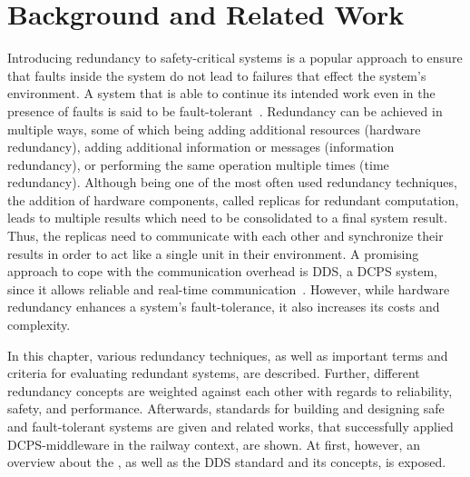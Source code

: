  \chapter{Background and Related Work}
\label{chptr:concepts}

Introducing redundancy to safety-critical systems is a popular approach to ensure that faults inside the system do not lead to failures that effect the system's environment.
A system that is able to continue its intended work even in the presence of faults is said to be fault-tolerant~\cite{BarryFaultToleranceAnalysis}.
Redundancy can be achieved in multiple ways, some of which being adding additional resources (hardware redundancy), adding additional information or messages (information redundancy), or performing the same operation multiple times (time redundancy).
Although being one of the most often used redundancy techniques, the addition of hardware components, called replicas for redundant computation, leads to multiple results which need to be consolidated to a final system result.
Thus, the replicas need to communicate with each other and synchronize their results in order to act like a single unit in their environment.
A promising approach to cope with the communication overhead is \gls*{DDS}, a \gls*{DCPS} system, since it allows reliable and real-time communication~\cite{omgDDSspec}.
However, while hardware redundancy enhances a system's fault-tolerance, it also increases its costs and complexity.

In this chapter, various redundancy techniques, as well as important terms and criteria for evaluating redundant systems, are described.
Further, different redundancy concepts are weighted against each other with regards to reliability, safety, and performance.
Afterwards, standards for building and designing safe and fault-tolerant systems are given and related works, that successfully applied \gls*{DCPS}-middleware in the railway context, are shown.
At first, however, an overview about the , as well as the \gls*{DDS} standard and its concepts, is exposed.


